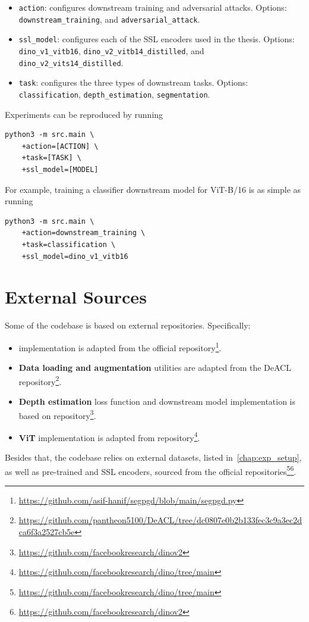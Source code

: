 \begin{itemize}
    \item \texttt{action}: configures downstream training and adversarial attacks. Options: \texttt{downstream\_training}, and \texttt{adversarial\_attack}.
    \item \texttt{ssl\_model}: configures each of the SSL encoders used in the thesis. Options: \texttt{dino\_v1\_vitb16}, \texttt{dino\_v2\_vitb14\_distilled}, and \newline\texttt{dino\_v2\_vits14\_distilled}.
    \item \texttt{task}: configures the three types of downstream tasks. Options: \newline\texttt{classification}, \texttt{depth\_estimation}, \texttt{segmentation}.
\end{itemize}
Experiments can be reproduced by running 
\begin{verbatim}
python3 -m src.main \
    +action=[ACTION] \
    +task=[TASK] \
    +ssl_model=[MODEL]
\end{verbatim}
For example, training a classifier downstream model for \DINOvone ViT-B/16 is as simple as running 
\begin{verbatim}
python3 -m src.main \
    +action=downstream_training \
    +task=classification \
    +ssl_model=dino_v1_vitb16
\end{verbatim}

\section{External Sources}

Some of the codebase is based on external repositories. Specifically:

\begin{itemize}
    \item \textbf{\SegPGD} implementation is adapted from the official \SegPGD repository\footnote{\url{https://github.com/asif-hanif/segpgd/blob/main/segpgd.py}}.
    \item \textbf{Data loading and augmentation} utilities are adapted from the DeACL~\cite{deacl} repository\footnote{\url{https://github.com/pantheon5100/DeACL/tree/dc0807e0b2b133fec3c9a3ec2dca6f3a2527cb5e}}.
    \item \textbf{Depth estimation} loss function and downstream model implementation is based on \DINOvtwo repository\footnote{\url{https://github.com/facebookresearch/dinov2}}.
    \item \textbf{ViT} implementation is adapted from \DINOvone repository\footnote{\url{https://github.com/facebookresearch/dino/tree/main}}.
\end{itemize}

Besides that, the codebase relies on external datasets, listed in~\cref{chap:exp_setup}, as well as pre-trained \DINOvone and \DINOvtwo SSL encoders, sourced from the official repositories\footnote{\url{https://github.com/facebookresearch/dino/tree/main}}\footnote{\url{https://github.com/facebookresearch/dinov2}}.
